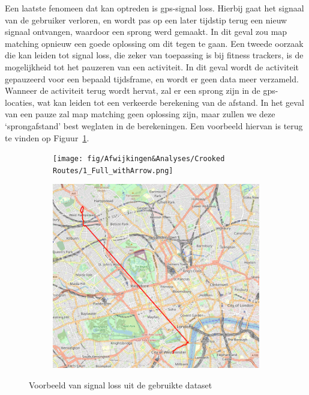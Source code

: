 Een laatste fenomeen dat kan optreden is \ac{gps}-signal loss. Hierbij gaat het
signaal van de gebruiker verloren, en wordt pas op een later tijdstip terug een
nieuw signaal ontvangen, waardoor een sprong werd gemaakt. In dit geval zou map
matching opnieuw een goede oplossing om dit tegen te gaan. Een tweede oorzaak
die kan leiden tot signal loss, die zeker van toepassing is bij fitness
trackers, is de mogelijkheid tot het pauzeren van een activiteit. In dit geval
wordt de activiteit gepauzeerd voor een bepaald tijdsframe, en wordt er geen
data meer verzameld. Wanneer de activiteit terug wordt hervat, zal er een
sprong zijn in de \ac{gps}-locaties, wat kan leiden tot een verkeerde
berekening van de afstand. In het geval van een pauze zal map matching geen
oplossing zijn, maar zullen we deze `sprongafstand' best weglaten in de
berekeningen. Een voorbeeld hiervan is terug te vinden op
Figuur~\ref{fig:gps_signal_loss}.
\begin{figure}
    \begin{subfigure}[b]{0.49\textwidth}
        \centering
        \texttt{[image: fig/Afwijkingen\&Analyses/Crooked Routes/1\_Full\_withArrow.png]}
    \end{subfigure}
    \begin{subfigure}[b]{0.49\textwidth}
        \centering
        \includegraphics[width=\textwidth]{fig/Afwijkingen&Analyses/Crooked Routes/1_Full_original.png}
    \end{subfigure}
    \caption{Voorbeeld van signal loss uit de gebruikte dataset}\label{fig:gps_signal_loss}
\end{figure}


